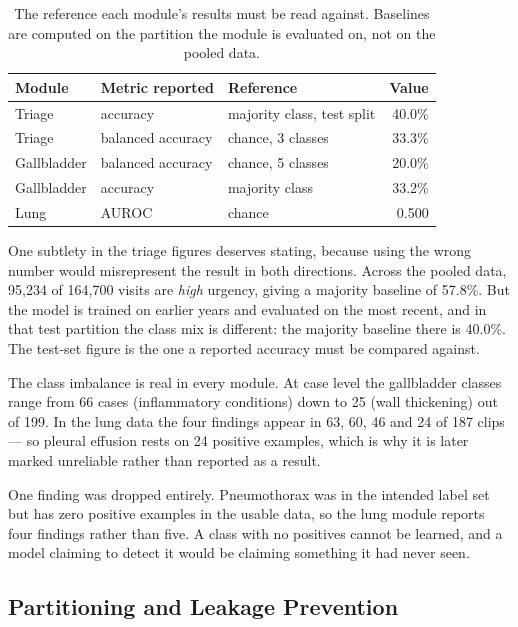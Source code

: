 \begin{table}[H]
  \centering
  \small
  \begin{tabular}{lllr}
    \toprule
    \textbf{Module} & \textbf{Metric reported} & \textbf{Reference} &
    \textbf{Value} \\
    \midrule
    Triage      & accuracy          & majority class, test split & 40.0\% \\
    Triage      & balanced accuracy & chance, 3 classes          & 33.3\% \\
    Gallbladder & balanced accuracy & chance, 5 classes          & 20.0\% \\
    Gallbladder & accuracy          & majority class             & 33.2\% \\
    Lung        & AUROC             & chance                     & 0.500 \\
    \bottomrule
  \end{tabular}
  \caption{The reference each module's results must be read against. Baselines are computed
    on the partition the module is evaluated on, not on the pooled data.}
  \label{tab:baselines}
\end{table}

One subtlety in the triage figures deserves stating, because using the wrong number would
misrepresent the result in both directions. Across the pooled data, 95{,}234 of 164{,}700
visits are \textit{high} urgency, giving a majority baseline of 57.8\%. But the model is
trained on earlier years and evaluated on the most recent, and in that test partition the
class mix is different: the majority baseline there is 40.0\%. The test-set figure is the
one a reported accuracy must be compared against.

The class imbalance is real in every module. At case level the gallbladder classes range
from 66 cases (inflammatory conditions) down to 25 (wall thickening) out of 199. In the lung
data the four findings appear in 63, 60, 46 and 24 of 187 clips --- so pleural effusion
rests on 24 positive examples, which is why it is later marked unreliable rather than
reported as a result.

One finding was dropped entirely. Pneumothorax was in the intended label set but has zero
positive examples in the usable data, so the lung module reports four findings rather than
five. A class with no positives cannot be learned, and a model claiming to detect it would
be claiming something it had never seen.

\subsection{Partitioning and Leakage Prevention}
\label{subsec:data-splits}

